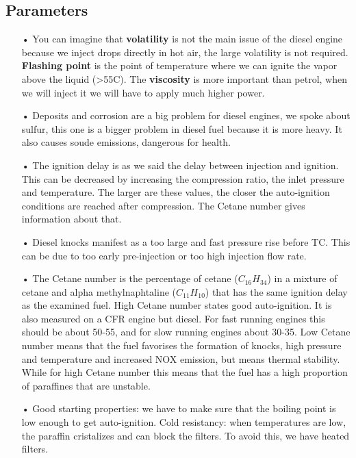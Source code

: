 \subsection{Parameters}
	\begin{itemize}
	\item[•] You can imagine that \textbf{volatility} is not the main issue of the diesel engine because we inject drops directly in hot air, the large volatility is not required. \textbf{Flashing point} is the point of temperature where we can ignite the vapor above the liquid (>55\degres C). The \textbf{viscosity }is more important than petrol, when we will inject it we will have to apply much higher power. \\
	
	\item[•] Deposits and corrosion are a big problem for diesel engines, we spoke about sulfur, this one is a bigger problem in diesel fuel because it is more heavy. It also causes soude emissions, dangerous for health. \\
	
	\item[•] The ignition delay is as we said the delay between injection and ignition. This can be decreased by increasing the compression ratio, the inlet pressure and temperature. The larger are these values, the closer the auto-ignition conditions are reached after compression. The Cetane number gives information about that. \\
	
	\item[•] Diesel knocks manifest as a too large and fast pressure rise before TC. This can be due to too early pre-injection or too high injection flow rate. \\
	
	\item[•] The Cetane number is the percentage of cetane ($C_{16}H_{34}$) in a mixture of cetane and alpha methylnaphtaline ($C_{11}H_{10}$) that has the same ignition delay as the examined fuel. High Cetane number states good auto-ignition. It is also measured on a CFR engine but diesel. For fast running engines this should be about 50-55, and for slow running engines about 30-35. Low Cetane number means that the fuel favorises the formation of knocks, high pressure and temperature and increased NOX emission, but means thermal stability. While for high Cetane number this means that the fuel has a high proportion of paraffines that are unstable. \\
	
	\item[•] Good starting properties: we have to make sure that the boiling point is low enough to get auto-ignition. Cold resistancy: when temperatures are low, the paraffin cristalizes and can block the filters. To avoid this, we have heated filters. 
	\end{itemize}		
	
